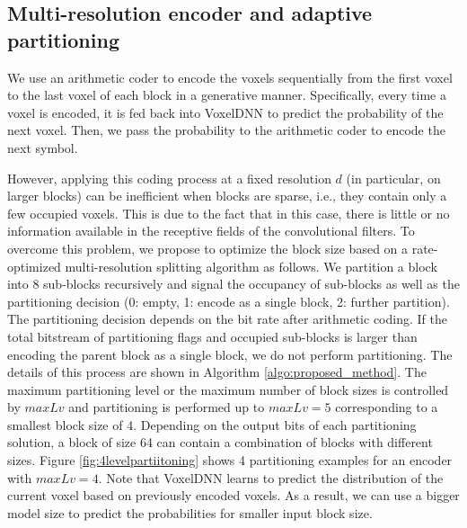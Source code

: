 \subsection{Multi-resolution encoder and adaptive partitioning}\label{ssec:multires}

We use an arithmetic coder to encode the voxels sequentially from the first voxel to the last voxel of each block in a generative manner. Specifically, every time a voxel is encoded, it is fed back into VoxelDNN to predict the probability of the next voxel. Then, we pass the probability to the arithmetic coder to encode the next symbol. 

However, applying this coding process at a fixed resolution $d$ (in particular, on larger blocks) can be inefficient when blocks are sparse, i.e.,  they contain only a few occupied voxels. 
This is due to the fact that in this case, there is little or no information available in the receptive fields of the convolutional filters. To overcome this problem, we propose to optimize the block size based on a rate-optimized multi-resolution splitting algorithm as follows.
We partition a block into 8 sub-blocks recursively and signal the occupancy of sub-blocks as well as the partitioning decision (0: empty, 1: encode as a single block, 2: further partition). The partitioning decision depends on the bit rate after arithmetic coding. If the total bitstream of partitioning flags and occupied sub-blocks is larger than encoding the parent block as a single block, we do not perform partitioning. The details of this process are shown in Algorithm \ref{algo:proposed_method}. The maximum partitioning level or the maximum number of block sizes is controlled by $maxLv$ and partitioning is performed up to $maxLv=5$ corresponding to a smallest block size of 4. Depending on the output bits of each partitioning solution, a block of size 64 can contain a combination of blocks with different sizes. Figure \ref{fig:4levelpartiitoning} shows 4 partitioning examples for an encoder with $maxLv=4$. Note that VoxelDNN learns to predict the distribution of the current voxel based on previously encoded voxels. As a result, we can use a bigger model size to predict the probabilities for smaller input block size. 



